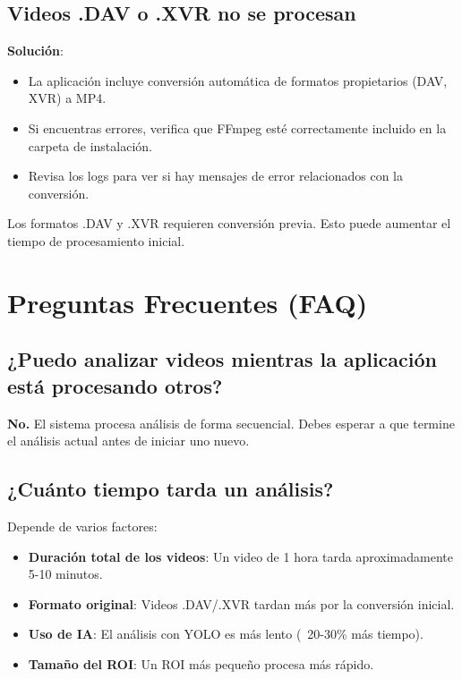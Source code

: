 \documentclass[11pt,a4paper]{article}
\begin{document}
\subsection{Videos .DAV o .XVR no se procesan}

\textbf{Solución}:
\begin{itemize}
    \item La aplicación incluye conversión automática de formatos propietarios (DAV, XVR) a MP4.
    \item Si encuentras errores, verifica que FFmpeg esté correctamente incluido en la carpeta de instalación.
    \item Revisa los logs para ver si hay mensajes de error relacionados con la conversión.
\end{itemize}

\begin{tcolorbox}[colback=warningorange!10,colframe=warningorange,title=Nota sobre Formatos]
Los formatos .DAV y .XVR requieren conversión previa. Esto puede aumentar el tiempo de procesamiento inicial.
\end{tcolorbox}

\section{Preguntas Frecuentes (FAQ)}

\subsection{¿Puedo analizar videos mientras la aplicación está procesando otros?}

\textbf{No.} El sistema procesa análisis de forma secuencial. Debes esperar a que termine el análisis actual antes de iniciar uno nuevo.

\subsection{¿Cuánto tiempo tarda un análisis?}

Depende de varios factores:
\begin{itemize}
    \item \textbf{Duración total de los videos}: Un video de 1 hora tarda aproximadamente 5-10 minutos.
    \item \textbf{Formato original}: Videos .DAV/.XVR tardan más por la conversión inicial.
    \item \textbf{Uso de IA}: El análisis con YOLO es más lento (~20-30\% más tiempo).
    \item \textbf{Tamaño del ROI}: Un ROI más pequeño procesa más rápido.
\end{itemize}
\end{document}
